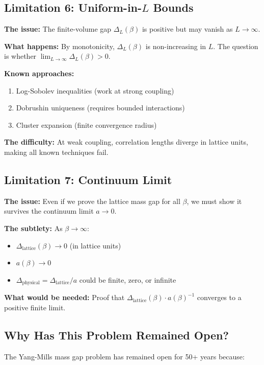\subsection{Limitation 6: Uniform-in-$L$ Bounds}

\textbf{The issue:} The finite-volume gap $\Delta_L(\beta)$ is positive but may vanish as $L \to \infty$.

\textbf{What happens:} By monotonicity, $\Delta_L(\beta)$ is non-increasing in $L$. The question is whether $\lim_{L \to \infty} \Delta_L(\beta) > 0$.

\textbf{Known approaches:}
\begin{enumerate}
    \item Log-Sobolev inequalities (work at strong coupling)
    \item Dobrushin uniqueness (requires bounded interactions)
    \item Cluster expansion (finite convergence radius)
\end{enumerate}

\textbf{The difficulty:} At weak coupling, correlation lengths diverge in lattice units, making all known techniques fail.

\subsection{Limitation 7: Continuum Limit}

\textbf{The issue:} Even if we prove the lattice mass gap for all $\beta$, we must show it survives the continuum limit $a \to 0$.

\textbf{The subtlety:} As $\beta \to \infty$:
\begin{itemize}
    \item $\Delta_{\text{lattice}}(\beta) \to 0$ (in lattice units)
    \item $a(\beta) \to 0$
    \item $\Delta_{\text{physical}} = \Delta_{\text{lattice}}/a$ could be finite, zero, or infinite
\end{itemize}

\textbf{What would be needed:} Proof that $\Delta_{\text{lattice}}(\beta) \cdot a(\beta)^{-1}$ converges to a positive finite limit.

\subsection{Why Has This Problem Remained Open?}

The Yang-Mills mass gap problem has remained open for 50+ years because:

